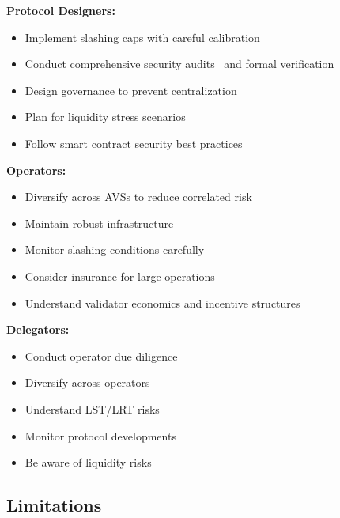 \documentclass[runningheads]{llncs}
\begin{document}
\textbf{Protocol Designers:}
\begin{itemize}
    \item Implement slashing caps with careful calibration~\cite{durvasula2024robust,certora2025}
    \item Conduct comprehensive security audits~\cite{certora2025,code4rena2023,trailofbits2024,openzeppelin2024} and formal verification~\cite{ahmed2021survey,certora2025}
    \item Design governance to prevent centralization~\cite{chen2022rollup}
    \item Plan for liquidity stress scenarios~\cite{trailofbits2023staking}
    \item Follow smart contract security best practices~\cite{huang2021survey,chen2020defining,luu2016making,rodler2018sereum}
\end{itemize}

\textbf{Operators:}
\begin{itemize}
    \item Diversify across AVSs to reduce correlated risk~\cite{durvasula2024robust}
    \item Maintain robust infrastructure
    \item Monitor slashing conditions carefully~\cite{certora2025}
    \item Consider insurance for large operations
    \item Understand validator economics and incentive structures
\end{itemize}

\textbf{Delegators:}
\begin{itemize}
    \item Conduct operator due diligence
    \item Diversify across operators
    \item Understand LST/LRT risks~\cite{renzo2024,etherfi2024,puffer2024,kelp2024,trailofbits2023staking}
    \item Monitor protocol developments
    \item Be aware of liquidity risks~\cite{li2021sovereign,trailofbits2023staking}
\end{itemize}

\subsection{Limitations}
\end{document}
